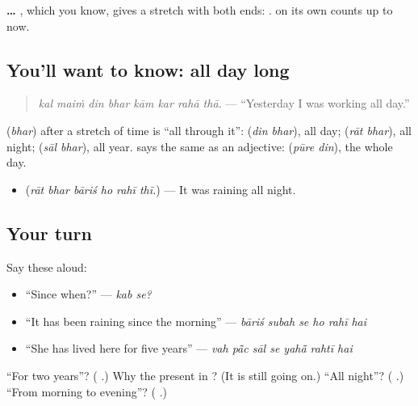 \textbf{ … }, which you know, gives a stretch with both ends: \textbf{   }. \textbf{} on its own counts up to now.

\subsection*{You'll want to know: all day long}
\begin{quote}
\textbf{       }
\end{quote}

\begin{quote}
\emph{kal maiṁ din bhar kām kar rahā thā.} — \textquotedblleft{}Yesterday I was working all day.\textquotedblright{}
\end{quote}

\textbf{} (\emph{bhar}) after a stretch of time is \textquotedblleft{}all through it\textquotedblright{}: \textbf{ } (\emph{din bhar}), all day; \textbf{ } (\emph{rāt bhar}), all night; \textbf{ } (\emph{sāl bhar}), all year. \textbf{} says the same as an adjective: \textbf{ } (\emph{pūre din}), the whole day.

\begin{itemize}
\raggedright
  \item \textbf{     } (\emph{rāt bhar bāriś ho rahī thī.}) — It was raining all night.
\end{itemize}

\subsection*{Your turn}
Say these aloud:

\begin{itemize}
\raggedright
  \item \textquotedblleft{}Since when?\textquotedblright{} — \emph{kab se?}
  \item \textquotedblleft{}It has been raining since the morning\textquotedblright{} — \emph{bāriś subah se ho rahī hai}
  \item \textquotedblleft{}She has lived here for five years\textquotedblright{} — \emph{vah pā̃c sāl se yahā̃ rahtī hai}
\end{itemize}

\begin{tcolorbox}[breakable,colback=teal!4,colframe=teal!35!black,title={Before you move on}]
\textquotedblleft{}For two years\textquotedblright{}? (\textbf{  }.) Why the present in \textbf{       }? (It is still going on.) \textquotedblleft{}All night\textquotedblright{}? (\textbf{ }.) \textquotedblleft{}From morning to evening\textquotedblright{}? (\textbf{   }.)
\end{tcolorbox}
